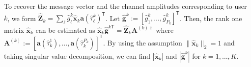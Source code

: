\documentclass[conference,10pt]{IEEEtran}
\theoremstyle{remark}
\theoremstyle{plain}
\theoremstyle{definition}
\theoremstyle{remark}
\begin{document}
 To recover the message vector and the channel amplitudes corresponding to user $k$, we form  $\widehat{\bm{Z}}_k=\sum\nolimits_{\ell}\widehat{g}_{\ell}^k \widehat{\bm{x}}_k\bm{a}(\widehat{\tau}_{\ell}^k)^{\mathsf{T}}$. Let $\widehat{\bm{g}}^k:=[\widehat{g}_1^k, \ldots,\widehat{g}_{P_k}^k]^{\mathsf{T}}$. Then, the rank one matrix $\widehat{\bm{x}}_k$ can be estimated as $\widehat{\bm{x}}_k\widehat{\bm{g}}^{k\mathsf{T}}=\widehat{\bm{Z}}_k\bm{A}^{(k)\dagger}$ where $\bm{A}^{(k)}:=[\bm{a}(\widehat{\tau}_k^1), \ldots,\bm{a}(\widehat{\tau}_k^{P_k})]^\mathsf{T}$. By using the assumption $\|\widehat{\bm{x}}_k\|_2=1$ and taking singular value decomposition, we can find $|\widehat{\bm{x}}_k|$ and $|\widehat{\bm{g}}^k|$ for $k=1, \ldots, K$.
 
 
\end{document}

